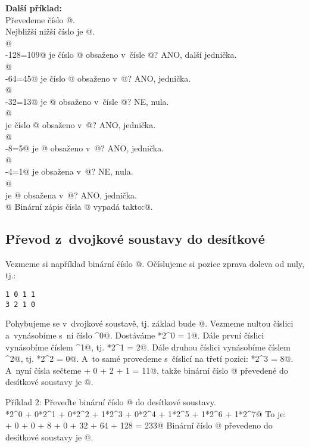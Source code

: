   \textbf{Další příklad:}\\
Převedeme číslo @. \\ 
Nejbližší nižší číslo je @. \\ 
 @  \\
-128=109@ je číslo @ obsaženo v~čísle @? ANO, další jednička. \\
@ \\ 
-64=45@ je číslo @ obsaženo v~@? ANO, jednička. \\
@  \\ 
-32=13@ je @ obsaženo v~čísle @? NE, nula. \\ 
@  \\ 
je číslo @ obsaženo v~@? ANO, jednička. \\
@ \\ 
-8=5@ je @ obsaženo v~@? ANO, jednička. \\
@ \\ 
-4=1@ je  obsažena v~@? NE, nula. \\
@ \\
je @ obsažena v~@? ANO, jednička. \\
@
Binární zápis čísla @ vypadá takto:@.


\subsection{Převod z~dvojkové soustavy do desítkové}

Vezmeme si například binární číslo @. Očíslujeme si pozice zprava doleva od nuly, tj.:
\begin{verbatim}
1 0 1 1
3 2 1 0
\end{verbatim}
Pohybujeme se v~dvojkové soustavě, tj. základ bude @. Vezmeme nultou číslici a~vynásobíme s~ní číslo ^0@. 
Dostáváme *2^0 = 1@.
Dále první číslici vynásobíme číslem ^1@, tj. *2^1 = 2@.
Dále druhou číslici vynásobíme číslem ^2@, tj. *2^2 = 0@.
A~to samé provedeme s~číslicí na třetí pozici: *2^3 = 8@.
A~nyní čísla sečteme  + 0 + 2 + 1 = 11@, takže binární číslo @ převedené do desítkové soustavy je @.

Příklad 2: Převeďte binární číslo @ do desítkové soustavy.\\
*2^0 + 0*2^1 + 0*2^2 + 1*2^3 + 0*2^4 + 1*2^5 + 1*2^6 + 1*2^7@
To je: \\
 + 0 + 0 + 8 + 0 + 32 + 64 + 128 = 233@
Binární číslo @ převedeno do desítkové soustavy je @.

